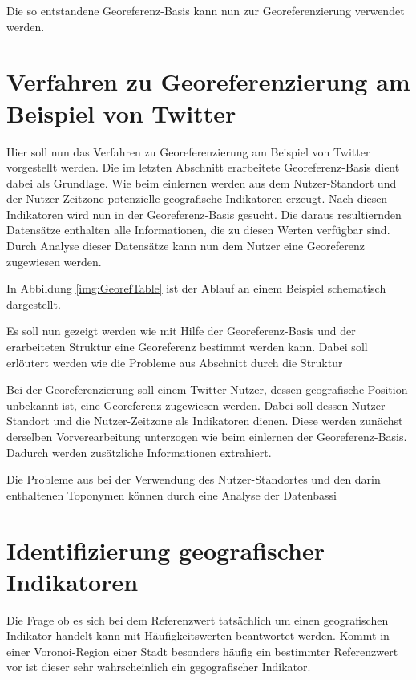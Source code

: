 			Die so entstandene Georeferenz-Basis kann nun zur Georeferenzierung verwendet werden. 

	\section{Verfahren zu Georeferenzierung am Beispiel von Twitter}

		Hier soll nun das Verfahren zu Georeferenzierung am Beispiel von Twitter vorgestellt werden.
		Die im letzten Abschnitt erarbeitete Georeferenz-Basis dient dabei als Grundlage.
		Wie beim einlernen werden aus dem Nutzer-Standort und der Nutzer-Zeitzone potenzielle geografische Indikatoren erzeugt.
		Nach diesen Indikatoren wird nun in der Georeferenz-Basis gesucht.
		Die daraus resultiernden Datensätze enthalten alle Informationen, die zu diesen Werten verfügbar sind.
		Durch Analyse dieser Datensätze kann nun dem Nutzer eine Georeferenz zugewiesen werden.

		In Abbildung \ref{img:GeorefTable} ist der Ablauf an einem Beispiel schematisch dargestellt.  

		Es soll nun gezeigt werden wie mit Hilfe der Georeferenz-Basis und der erarbeiteten Struktur eine Georeferenz bestimmt werden kann.
		Dabei soll erlöutert werden wie die Probleme aus Abschnitt  durch die Struktur




		Bei der Georeferenzierung soll einem Twitter-Nutzer, dessen geografische Position unbekannt ist, eine Georeferenz zugewiesen werden.
		Dabei soll dessen Nutzer-Standort und die Nutzer-Zeitzone als Indikatoren dienen. 
		Diese werden zunächst derselben Vorverearbeitung unterzogen wie beim einlernen der Georeferenz-Basis.
		Dadurch werden zusätzliche Informationen extrahiert.


		Die Probleme aus bei der Verwendung des Nutzer-Standortes und den darin enthaltenen Toponymen können durch eine Analyse der Datenbassi 





		\section{Identifizierung geografischer Indikatoren}

			Die Frage ob es sich bei dem Referenzwert tatsächlich um einen geografischen Indikator handelt kann mit Häufigkeitswerten beantwortet werden.
			Kommt in einer Voronoi-Region einer Stadt besonders häufig ein bestimmter Referenzwert vor ist dieser sehr wahrscheinlich ein gegografischer Indikator.

